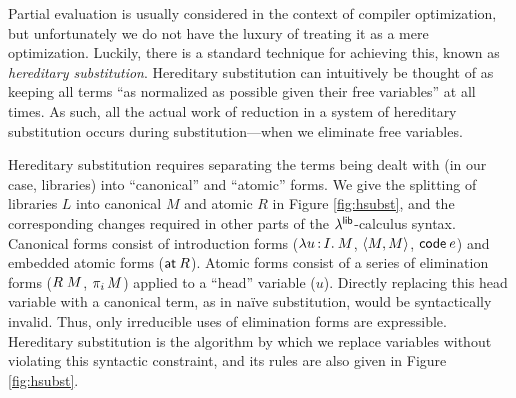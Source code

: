 \documentclass[11pt]{article}
\begin{document}
Partial evaluation is usually considered in the context of compiler
optimization, but unfortunately we do not have the luxury of treating it as a
mere optimization. Luckily, there is a standard technique for achieving this,
known as \emph{hereditary substitution}. Hereditary substitution can intuitively
be thought of as keeping all terms ``as normalized as possible given their free
variables'' at all times. As such, all the actual work of reduction in a system
of hereditary substitution occurs during substitution---when we eliminate free
variables.

Hereditary substitution requires separating the terms being dealt with (in our
case, libraries) into ``canonical'' and ``atomic'' forms. We give the splitting
of libraries $L$ into canonical $M$ and atomic $R$ in Figure \ref{fig:hsubst},
and the corresponding changes required in other parts of the $\lambda^{\textsf{lib}}$-calculus
syntax. Canonical forms consist of introduction forms ($\lambda u \mathop{:} I .\: M$,
$\left\langle M,M\right\rangle$, $\textsf{code}\:{e}$) and embedded atomic forms ($\textsf{at}\:{R}$). Atomic forms
consist of a series of elimination forms ($R \; M$, $\pi_{i} \, M$) applied to a
``head'' variable ($u$). Directly replacing this head variable with a canonical
term, as in na\"ive substitution, would be syntactically invalid. Thus, only
irreducible uses of elimination forms are expressible. Hereditary substitution
is the algorithm by which we replace variables without violating this syntactic
constraint, and its rules are also given in Figure \ref{fig:hsubst}.
\end{document}
